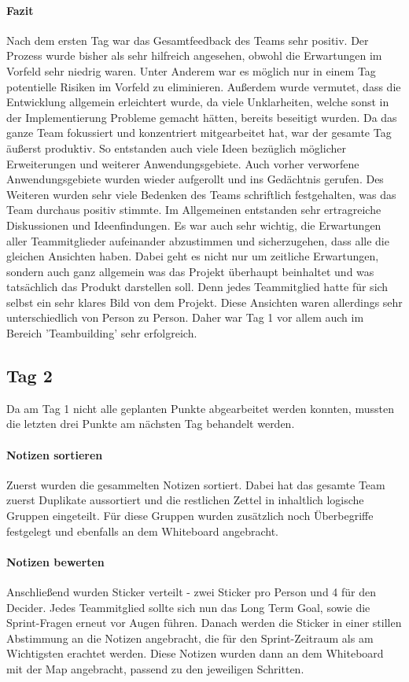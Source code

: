\paragraph{Fazit}
Nach dem ersten Tag war das Gesamtfeedback des Teams sehr positiv. Der Prozess wurde bisher als sehr hilfreich angesehen, obwohl die Erwartungen im Vorfeld sehr niedrig waren. Unter Anderem war es möglich nur in einem Tag potentielle Risiken im Vorfeld zu eliminieren. Außerdem wurde vermutet, dass die Entwicklung allgemein erleichtert wurde, da viele Unklarheiten, welche sonst in der Implementierung Probleme gemacht hätten, bereits beseitigt wurden. Da das ganze Team fokussiert und konzentriert mitgearbeitet hat, war der gesamte Tag äußerst produktiv. So entstanden auch viele Ideen bezüglich möglicher Erweiterungen und weiterer Anwendungsgebiete. Auch vorher verworfene Anwendungsgebiete wurden wieder aufgerollt und ins Gedächtnis gerufen. Des Weiteren wurden sehr viele Bedenken des Teams schriftlich festgehalten, was das Team durchaus positiv stimmte. Im Allgemeinen entstanden sehr ertragreiche Diskussionen und Ideenfindungen. Es war auch sehr wichtig, die Erwartungen aller Teammitglieder aufeinander abzustimmen und sicherzugehen, dass alle die gleichen Ansichten haben. Dabei geht es nicht nur um zeitliche Erwartungen, sondern auch ganz allgemein was das Projekt überhaupt beinhaltet und was tatsächlich das Produkt darstellen soll. Denn jedes Teammitglied hatte für sich selbst ein sehr klares Bild von dem Projekt. Diese Ansichten waren allerdings sehr unterschiedlich von Person zu Person. Daher war Tag 1 vor allem auch im Bereich 'Teambuilding' sehr erfolgreich.

\subsection{Tag 2}
Da am Tag 1 nicht alle geplanten Punkte abgearbeitet werden konnten, mussten die letzten drei Punkte am nächsten Tag behandelt werden.

\paragraph{Notizen sortieren}
Zuerst wurden die gesammelten Notizen sortiert. Dabei hat das gesamte Team zuerst Duplikate aussortiert und die restlichen Zettel in inhaltlich logische Gruppen eingeteilt. Für diese Gruppen wurden zusätzlich noch Überbegriffe festgelegt und ebenfalls an dem Whiteboard angebracht.

\paragraph{Notizen bewerten}
Anschließend wurden Sticker verteilt - zwei Sticker pro Person und 4 für den Decider. Jedes Teammitglied sollte sich nun das Long Term Goal, sowie die Sprint-Fragen erneut vor Augen führen. Danach werden die Sticker in einer stillen Abstimmung an die Notizen angebracht, die für den Sprint-Zeitraum als am Wichtigsten erachtet werden. Diese Notizen wurden dann an dem Whiteboard mit der Map angebracht, passend zu den jeweiligen Schritten.

